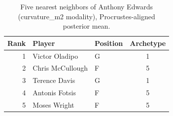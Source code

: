 \begin{table}[htbp]
  \centering\small
  \begin{tabular}{rllc}
    \toprule
    Rank & Player & Position & Archetype \\
    \midrule
    1 & Victor Oladipo & G & 1 \\
    2 & Chris McCullough & F & 5 \\
    3 & Terence Davis & G & 1 \\
    4 & Antonis Fotsis & F & 5 \\
    5 & Moses Wright & F & 5 \\
    \bottomrule
  \end{tabular}
  \caption{Five nearest neighbors of Anthony Edwards (curvature_m2 modality), Procrustes-aligned posterior mean.}
  \label{tab:Anthony_Edwards_neighbors_curvature_m2}
\end{table}


